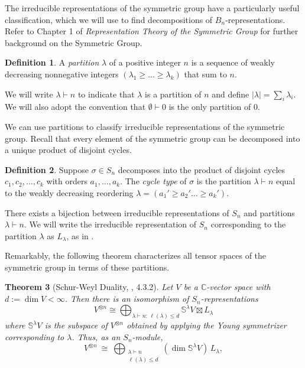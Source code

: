 \documentclass{amsart}
\theoremstyle{plain}
\newtheorem{theorem}{Theorem}[section]
\theoremstyle{definition}
\newtheorem{definition}[theorem]{Definition}
\begin{document}
The irreducible representations of the symmetric group have a particularly useful classification, which we will use to find decompositions of $B_n$-representations.
Refer to Chapter 1 of \textit{Representation Theory of the Symmetric Group} \cite{jameskerber84} for further background on the Symmetric Group.

\begin{definition}
A \textit{partition} $\lambda$ of a positive integer $n$ is a sequence of weakly decreasing nonnegative 
integers $(\lambda_1 \geq ... \geq  \lambda_k)$ that sum to $n$.
\end{definition}
We will write $\lambda \vdash n$ to indicate that $\lambda$ is a partition of $n$ and define $|\lambda| = \sum_i \lambda_i$. We will also adopt the convention that $\emptyset \vdash 0$ is the only partition of 0.

We can use partitions to classify irreducible representations of the symmetric group. Recall that every element of the symmetric group can be decomposed into a unique product of disjoint cycles. 

\begin{definition}
    Suppose $\sigma \in S_n$ decomposes into the product of disjoint cycles $c_1, c_2,...,c_k$ with orders $a_1,\dots, a_k.$ The \textit{cycle type} of $\sigma$ is the partition $\lambda \vdash n$ equal to the weakly decreasing reordering $\lambda = (a_1' \geq a_2' \dots \geq a_k')$. 
\end{definition}

There exists a bijection between irreducible representations of $S_n$ and partitions $\lambda\vdash n.$ We will write the irreducible representation of $S_n$ corresponding to the partition $\lambda$ as $L_{\lambda}$, as in \cite[35-36]{jameskerber84}.

Remarkably, the following theorem characterizes all tensor spaces of the symmetric group in terms of these partitions. 


\begin{theorem}[Schur-Weyl Duality, \cite{jameskerber84}, 4.3.2] Let $V$ be a $\mathbb{C}$-vector space with $d := \dim V < \infty$. Then there is an isomorphism of $S_n$-representations  $$V^{\otimes n} \cong \bigoplus_{\lambda \vdash n:\, \ell(\lambda) \leq d} \mathbb{S}^\lambda V \boxtimes L_\lambda
  $$
where $\mathbb{S}^{\lambda}V$ is the subspace of $V^{\otimes n}$ obtained by applying the Young symmetrizer corresponding to $\lambda$.
Thus, as an $S_n$-module,
\[
V^{\otimes n}\ \cong\ \bigoplus_{\substack{\lambda\vdash n\\ \ell(\lambda)\le d}}
(\dim \mathbb{S}^\lambda V)\,L_\lambda,
\]
 
\end{theorem}
\end{document}
